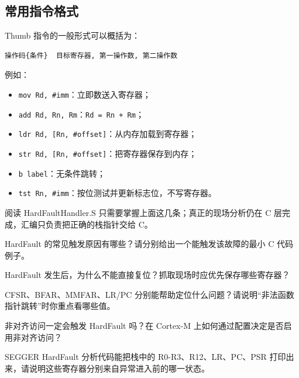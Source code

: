 \subsection{常用指令格式}

Thumb 指令的一般形式可以概括为：

\begin{lstlisting}
操作码{条件}  目标寄存器, 第一操作数, 第二操作数
\end{lstlisting}

例如：

\begin{itemize}
\item \texttt{mov Rd, \#imm}：立即数送入寄存器；
\item \texttt{add Rd, Rn, Rm}：\texttt{Rd = Rn + Rm}；
\item \texttt{ldr Rd, [Rn, \#offset]}：从内存加载到寄存器；
\item \texttt{str Rd, [Rn, \#offset]}：把寄存器保存到内存；
\item \texttt{b label}：无条件跳转；
\item \texttt{tst Rn, \#imm}：按位测试并更新标志位，不写寄存器。
\end{itemize}

阅读 HardFaultHandler.S 只需要掌握上面这几条；真正的现场分析仍在 C 层完成，汇编只负责把正确的栈指针交给 C。

\begin{problemset}
\item HardFault 的常见触发原因有哪些？请分别给出一个能触发该故障的最小 C 代码例子。
\item HardFault 发生后，为什么不能直接复位？抓取现场时应优先保存哪些寄存器？
\item CFSR、BFAR、MMFAR、LR/PC 分别能帮助定位什么问题？请说明“非法函数指针跳转”时你重点看哪些值。
\item 非对齐访问一定会触发 HardFault 吗？在 Cortex-M 上如何通过配置决定是否启用非对齐访问？
\item SEGGER HardFault 分析代码能把栈中的 R0-R3、R12、LR、PC、PSR 打印出来，请说明这些寄存器分别来自异常进入前的哪一状态。
\end{problemset}
